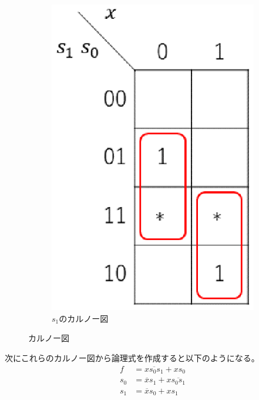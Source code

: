\documentclass{jsarticle}
\begin{document}
\begin{description}
\begin{description}
\begin{figure}[H]
\begin{subfigure}{0.2\columnwidth}
                    \includegraphics[width=\columnwidth]{fig_2_s1.eps}
                    \caption{$s_1$のカルノー図}
                    \label{fig2_s1}
                \end{subfigure}
                \caption{カルノー図}
                \label{fig2}
            \end{figure}

            次にこれらのカルノー図から論理式を作成すると以下のようになる。
            \begin{align}
                f &= \overline{x s_0 s_1} + xs_0 \\
                s_0 &= \overline{x}s_1 + x\overline{s_0 s_1} \\
                s_1 &= \overline{x}s_0 + xs_1
            \end{align}


\end{description}
\end{description}
\end{document}
